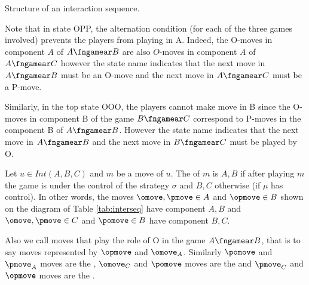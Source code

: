 \begin{table}[htbp]
\begin{center}
\end{center}
\caption{Structure of an interaction sequence.}
\label{tab:interseq}
\end{table}

Note that in state OPP, the alternation condition (for each of the three games involved) prevents the players from playing in A. Indeed, the O-moves in component $A$ of $A\fngamear B$ are also $O$-moves in component $A$ of $A\fngamear C$ however the state name indicates that the next move in $A\fngamear B$ must be an O-move and the next move in $A\fngamear C$ must be a P-move.

Similarly, in the top state OOO, the players cannot make move in B since the O-moves in component B of the game $B\fngamear C$ correspond to P-moves in the component B of $A\fngamear B$. However the state name indicates that the next move in $A\fngamear B$ and the next move in $B\fngamear C$ must be played by O.


Let $u \in Int(A,B,C)$ and $m$ be a move of $u$.
The  of $m$ is $A,B$ if
after playing $m$ the game is under the control
of the strategy $\sigma$ and $B,C$ otherwise (if $\mu$ has control).
In other words, the moves $\omove, \pmove \in A$
and $\opmove \in B$ shown on the diagram of Table \ref{tab:interseq}
have component $A,B$ and
$\omove, \pmove \in C$ and $\pomove \in B$
have component $B,C$.


Also we call 
moves that play the role of O in the game $A\fngamear B$, that is to say moves represented by $\opmove$ and $\omove_A$.
Similarly $\pomove$ and $\pmove_A$ moves are the ,
$\omove_C$ and $\pomove$ moves are
the 
and  $\pmove_C$ and $\opmove$ moves are the .

